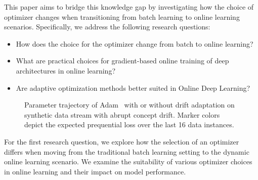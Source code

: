 \documentclass[letterpaper]{article} %
\begin{document}
This paper aims to bridge this knowledge gap by investigating how the choice of optimizer changes when transitioning from batch learning to online learning scenarios. Specifically, we address the following research questions:
\begin{itemize}
	\item How does the choice for the optimizer change from batch to online learning?
	\item What are practical choices for gradient-based online training of deep architectures in online learning?
	\item Are adaptive optimization methods better suited in Online Deep Learning?
\end{itemize}
\begin{figure}[ht]
	\centering
	\caption{Parameter trajectory of Adam~\cite{kingmaAdamMethodStochastic2017b} with or without drift adaptation on synthetic data stream with abrupt concept drift. Marker colors depict the expected prequential loss over the last 16 data instances.}
\end{figure}
For the first research question, we explore how the selection of an optimizer differs when moving from the traditional batch learning setting to the dynamic online learning scenario. We examine the suitability of various optimizer choices in online learning and their impact on model performance.
\end{document}

